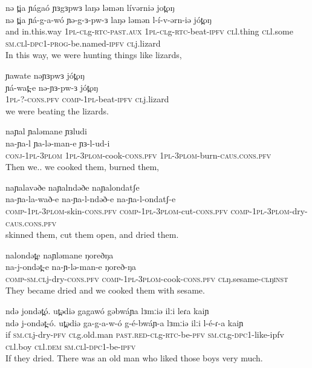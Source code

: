\ex  	nə t̪ia ɲágaó ɲɜgɜpwɜ laŋə ləmən lívərniə jot̪oŋ	 \\	
		\gll nə t̪ia ɲá-g-a-wó ɲə-g-ɜ-pw-ɜ laŋə ləmən l-í-v-ərn-iə jót̪oŋ \\	
		and in.this.way \textsc{1pl-cl}g-\textsc{rtc-past.aux} \textsc{1pl-cl}g-\textsc{rtc}-beat-\textsc{ipfv} \textsc{cl}l.thing \textsc{cl}l.some \textsc{sm.cl}l-\textsc{dpc1-prog}-be.named-\textsc{ipfv} \textsc{cl}j.lizard\\
		\glt In this way, we were hunting things like lizards,
		
\ex  	ɲawate nəɲɜpwɜ jót̪oŋ	 \\	
		\gll ɲá-wat̪-e nə-ɲɜ-pw-ɜ jót̪oŋ\\	
		\textsc{1pl}-?-\textsc{cons.pfv} \textsc{comp-1pl}-beat-\textsc{ipfv} \textsc{cl}j.lizard\\
		\glt we were beating the lizards.
		
\ex  	naɲal ɲaləmane ɲɜludi \\	
		\gll na-ɲa-l ɲa-lə-man-e ɲɜ-l-ud-i  \\	
		\textsc{conj-1pl-3plom} \textsc{1pl-3plom}-cook-\textsc{cons.pfv} \textsc{1pl-3plom}-burn-\textsc{caus.cons.pfv} \\
		\glt Then we.. we cooked them, burned them, 
				
				\ex  	naɲalavəðe naɲalndəðe naɲalondatʃe \\	
		\gll na-ɲa-la-wað-e na-ɲa-l-ndəð-e na-ɲa-l-ondatʃ-e \\	
		\textsc{comp-1pl-3plom}-skin-\textsc{cons.pfv}  \textsc{comp-1pl-3plom}-cut-\textsc{cons.pfv}  \textsc{comp-1pl-3plom}-dry-\textsc{caus.cons.pfv}  \\
		\glt skinned them, cut them open, and dried them. %
		
\ex  	nalondət̪e naɲləmane ŋoreðŋa	 \\	
		\gll na-j-ondət̪-e na-ɲ-lə-man-e ŋoreð-ŋa\\	
		\textsc{comp-sm.cl}j-dry-\textsc{cons.pfv} \textsc{comp-1pl-3plom}-cook-\textsc{cons.pfv} \textsc{cl}ŋ.sesame-\textsc{cl}ŋ\textsc{inst} \\
		\glt They became dried and we cooked them with sesame. 
		
\ex  	ndə jondət̪ó. ut̪ədiə gagawó gəbwáɲa lɜmːiə ilːi leɾa kaiɲ\\	
		\gll ndə j-ondət̪-ó. ut̪ədiə ga-g-a-w-ó g-é-bwáɲ-a lɜmːiə ilːi l-é-ɾ-a kaiɲ\\	
		if \textsc{sm.cl}j-dry-\textsc{pfv} \textsc{cl}g.old.man \textsc{past.red-cl}g-\textsc{rtc}-be-\textsc{pfv} \textsc{sm.cl}g-\textsc{dpc1}-like-{ipfv} \textsc{cl}l.boy \textsc{cl}l.\textsc{dem} \textsc{sm.cl}l-\textsc{dpc1}-be-\textsc{ipfv}\\
		\glt If they dried. There was an old man who liked those boys very much.  
		
